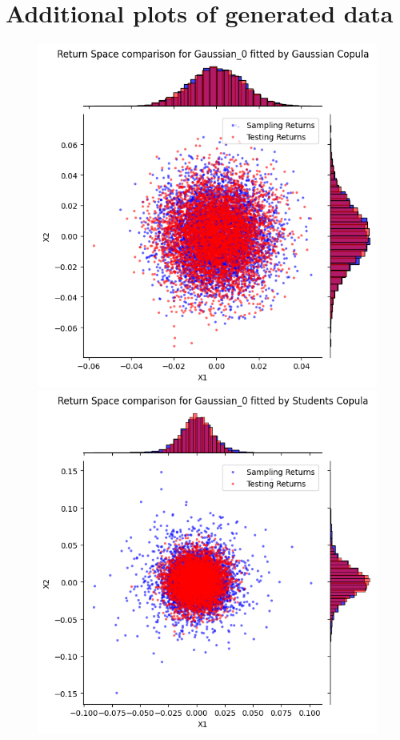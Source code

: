 \documentclass[%
a4paper,							
11pt,								
bibliography=totoc,						
abstracton=true					
]
{scrartcl}
\theoremstyle{plain}
\theoremstyle{definition}
\theoremstyle{remark}
\newcommand{\1}{\mathbbm{1}}
\begin{document}
\section{Additional plots of generated data}\label{sec:CopulaResultsData}
\begin{figure}[H]
    \centering
    \begin{minipage}{0.4\textwidth}
        \centering
        \includegraphics[width=\textwidth]{5ResultsDiscussion/pictures/PortfolioTest/ResultPortfolio1Gauss.png}
    \end{minipage}
    \hfill
    \begin{minipage}{0.4\textwidth}
        \centering
        \includegraphics[width=\textwidth]{5ResultsDiscussion/pictures/PortfolioTest/ResultPortfolio1Students.png}

\end{minipage}
\end{figure}
\end{document}
